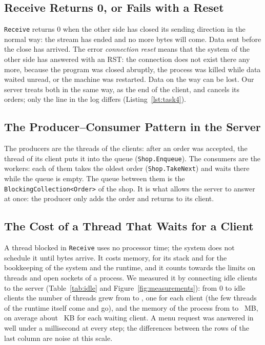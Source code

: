 \documentclass[12pt,a4paper]{article}
\begin{document}
\subsection{Receive Returns 0, or Fails with a Reset}

\texttt{Receive} returns 0 when the other side has closed its sending direction in the normal way: the stream has ended and no more bytes will come. Data sent before the close has arrived. The error \textit{connection reset} means that the system of the other side has answered with an RST: the connection does not exist there any more, because the program was closed abruptly, the process was killed while data waited unread, or the machine was restarted. Data on the way can be lost. Our server treats both in the same way, as the end of the client, and cancels its orders; only the line in the log differs (Listing~\ref{lst:task4}).

\subsection{The Producer--Consumer Pattern in the Server}

The producers are the threads of the clients: after an order was accepted, the thread of its client puts it into the queue (\texttt{Shop.Enqueue}). The consumers are the workers: each of them takes the oldest order (\texttt{Shop.TakeNext}) and waits there while the queue is empty. The queue between them is the \texttt{BlockingCollection<Order>} of the shop. It is what allows the server to answer at once: the producer only adds the order and returns to its client.

\subsection{The Cost of a Thread That Waits for a Client}

A thread blocked in \texttt{Receive} uses no processor time; the system does not schedule it until bytes arrive. It costs memory, for its stack and for the bookkeeping of the system and the runtime, and it counts towards the limits on threads and open sockets of a process. We measured it by connecting idle clients to the server (Table~\ref{tab:idle} and Figure~\ref{fig:measurements}): from 0 to \idleClientsMax{} idle clients the number of threads grew from \idleThreadsZero{} to \idleThreadsMax{}, one for each client (the few threads of the runtime itself come and go), and the memory of the process from \idleMemZero{} to \idleMemMax~MB, on average about \idleKbPerClient~KB for each waiting client. A menu request was answered in well under a millisecond at every step; the differences between the rows of the last column are noise at this scale.
\end{document}
